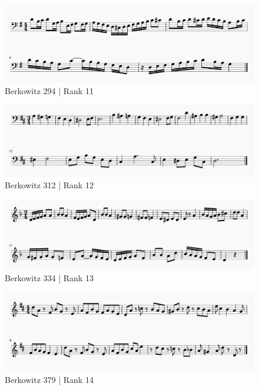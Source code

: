 \documentclass[]{book}
\begin{document}
\begin{figure}

{\centering \includegraphics[width=1\linewidth]{img/survey_melodies/Berkowitz294} 

}

\caption{Berkowitz 294 | Rank 11}\label{fig:berk294}
\end{figure}

\begin{figure}

{\centering \includegraphics[width=1\linewidth]{img/survey_melodies/Berkowitz312} 

}

\caption{Berkowitz 312 | Rank 12}\label{fig:berk312}
\end{figure}

\begin{figure}

{\centering \includegraphics[width=1\linewidth]{img/survey_melodies/Berkowitz334t} 

}

\caption{Berkowitz 334 | Rank 13}\label{fig:berk334t}
\end{figure}

\begin{figure}

{\centering \includegraphics[width=1\linewidth]{img/survey_melodies/Berkowitz379} 

}

\caption{Berkowitz 379 | Rank 14}\label{fig:berk379}
\end{figure}
\end{document}
